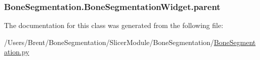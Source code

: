 \subsubsection[{parent}]{\setlength{\rightskip}{0pt plus 5cm}Bone\+Segmentation.\+Bone\+Segmentation\+Widget.\+parent}\label{class_bone_segmentation_1_1_bone_segmentation_widget_a0ea50b4a0dff60a3f20d473fa7c5267f}


The documentation for this class was generated from the following file\+:\begin{DoxyCompactItemize}
\item 
/\+Users/\+Brent/\+Bone\+Segmentation/\+Slicer\+Module/\+Bone\+Segmentation/\hyperlink{_bone_segmentation_8py}{Bone\+Segmentation.\+py}\end{DoxyCompactItemize}
